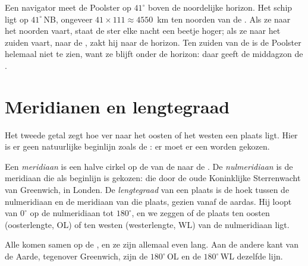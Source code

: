 \begin{example}\label{ex:g6:latitude-longitude:pole-star}
Een navigator meet de Poolster op $41^\circ$ boven de noordelijke horizon.
Het schip ligt op $41^\circ$\,NB, ongeveer $41 \times 111
\approx \num{4550}$~km ten noorden van de . Als ze naar het noorden
vaart, staat de ster elke nacht een beetje hoger; als ze naar het zuiden
vaart, naar de , zakt hij naar de horizon. Ten zuiden van de 
is de Poolster helemaal niet te zien, want ze blijft onder de horizon: daar
geeft de middagzon de .
\end{example}

\section{Meridianen en lengtegraad}

Het tweede getal zegt hoe ver naar het oosten of het westen een plaats ligt.
Hier is er geen natuurlijke beginlijn zoals de : er moet er een
worden gekozen.

\begin{definition}\label{def:g6:latitude-longitude:longitude}
Een \emph{meridiaan} is een halve cirkel op de  van de
 naar de . De \emph{nulmeridiaan} is
de meridiaan die als beginlijn is gekozen: die door de oude Koninklijke
Sterrenwacht van Greenwich, in Londen. De
\emph{lengtegraad} van een plaats is de hoek tussen de
nulmeridiaan en de meridiaan van die plaats, gezien vanaf de aardas. Hij
loopt van $0^\circ$ op de nulmeridiaan tot $180^\circ$, en we zeggen of de
plaats ten oosten (oosterlengte, OL) of ten westen (westerlengte, WL) van
de nulmeridiaan ligt.
\end{definition}

Alle  komen samen op de , en ze zijn allemaal even lang. Aan
de andere kant van de Aarde, tegenover Greenwich, zijn de 
$180^\circ$\,OL en de  $180^\circ$\,WL dezelfde lijn.

